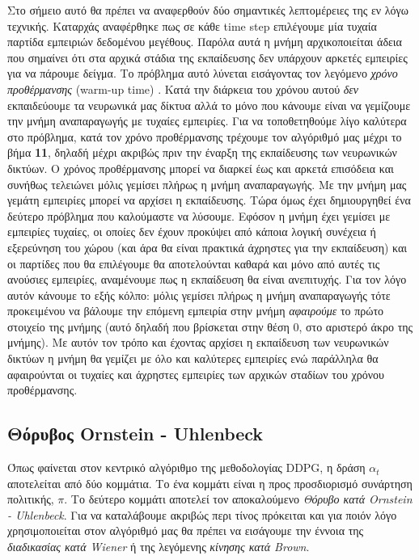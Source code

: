 \documentclass[11pt]{article} %
\numberwithin{equation}{subsection}
\begin{document}
Στο σήμειο αυτό θα πρέπει να αναφερθούν δύο σημαντικές λεπτομέρειες της εν λόγω τεχνικής. Καταρχάς αναφέρθηκε πως σε κάθε time step επιλέγουμε μία τυχαία παρτίδα εμπειριών δεδομένου μεγέθους. Παρόλα αυτά η μνήμη αρχικοποιείται άδεια που σημαίνει ότι στα αρχικά στάδια της εκπαίδευσης δεν υπάρχουν αρκετές εμπειρίες για να πάρουμε δείγμα. Το πρόβλημα αυτό λύνεται εισάγοντας τον λεγόμενο \textit{χρόνο προθέρμανσης} (warm-up time) \cite{warmuptime}. Κατά την διάρκεια του χρόνου αυτού \textit{δεν} εκπαιδεύουμε τα νευρωνικά μας δίκτυα αλλά το μόνο που κάνουμε είναι να γεμίζουμε την μνήμη αναπαραγωγής με τυχαίες εμπειρίες. Για να τοποθετηθούμε λίγο καλύτερα στο πρόβλημα, κατά τον χρόνο προθέρμανσης τρέχουμε τον αλγόριθμό μας μέχρι το βήμα \textbf{11}, δηλαδή μέχρι ακριβώς πριν την έναρξη της εκπαίδευσης των νευρωνικών δικτύων. Ο χρόνος προθέρμανσης μπορεί να διαρκεί έως και αρκετά επισόδεια και συνήθως τελειώνει μόλις γεμίσει πλήρως η μνήμη αναπαραγωγής. Με την μνήμη μας γεμάτη εμπειρίες μπορεί να αρχίσει η εκπαίδευσης. Τώρα όμως έχει δημιουργηθεί ένα δεύτερο πρόβλημα που καλούμαστε να λύσουμε. Εφόσον η μνήμη έχει γεμίσει με εμπειρίες τυχαίες, οι οποίες δεν έχουν προκύψει από κάποια λογική συνέχεια ή εξερεύνηση του χώρου (και άρα θα είναι πρακτικά άχρηστες για την εκπαίδευση) και οι παρτίδες που θα επιλέγουμε θα αποτελούνται καθαρά και μόνο από αυτές τις ανούσιες εμπειρίες, αναμένουμε πως η εκπαίδευση θα είναι ανεπιτυχής. Για τον λόγο αυτόν κάνουμε το εξής κόλπο: μόλις γεμίσει πλήρως η μνήμη αναπαραγωγής τότε προκειμένου να βάλουμε την επόμενη εμπειρία στην μνήμη \textit{αφαιρούμε} το πρώτο στοιχείο της μνήμης (αυτό δηλαδή που βρίσκεται στην θέση 0, στο αριστερό άκρο της μνήμης). Με αυτόν τον τρόπο και έχοντας αρχίσει η εκπαίδευση των νευρωνικών δικτύων η μνήμη θα γεμίζει με όλο και καλύτερες εμπειρίες ενώ παράλληλα θα αφαιρούνται οι τυχαίες και άχρηστες εμπειρίες των αρχικών σταδίων του χρόνου προθέρμανσης.


\subsection{Θόρυβος Ornstein - Uhlenbeck}
Όπως φαίνεται στον κεντρικό αλγόριθμο της μεθοδολογίας DDPG, η δράση $\alpha_t$ αποτελείται από δύο κομμάτια. Το ένα κομμάτι είναι η προς προσδιορισμό συνάρτηση πολιτικής, $\pi$. Το δεύτερο κομμάτι αποτελεί τον αποκαλούμενο \textit{Θόρυβο κατά Ornstein - Uhlenbeck}. Για να καταλάβουμε ακριβώς περι τίνος πρόκειται και για ποιόν λόγο χρησιμοποιείται στον αλγόριθμό μας θα πρέπει να εισάγουμε την έννοια της \textit{διαδικασίας κατά Wiener} ή της λεγόμενης \textit{κίνησης κατά Brown}.\\
\end{document}
